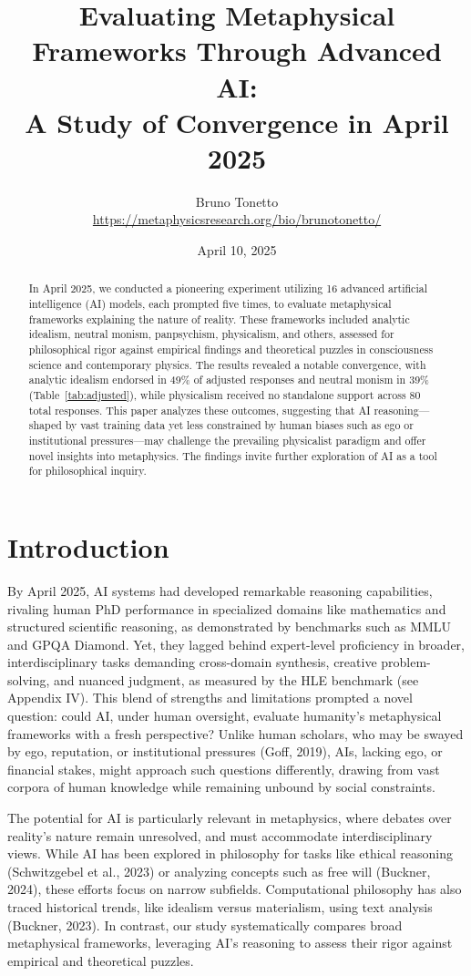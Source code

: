\documentclass[11pt]{article}
\title{Evaluating Metaphysical Frameworks Through Advanced AI: \\ A Study of Convergence in April 2025}
\author{Bruno Tonetto\\
\url{https://metaphysicsresearch.org/bio/brunotonetto/}}
\date{April 10, 2025}
\begin{document}
\maketitle

\begin{abstract}
In April 2025, we conducted a pioneering experiment utilizing 16 advanced artificial intelligence (AI) models, each prompted five times, to evaluate metaphysical frameworks explaining the nature of reality. These frameworks included analytic idealism, neutral monism, panpsychism, physicalism, and others, assessed for philosophical rigor against empirical findings and theoretical puzzles in consciousness science and contemporary physics. The results revealed a notable convergence, with analytic idealism endorsed in 49\% of adjusted responses and neutral monism in 39\% (Table~\ref{tab:adjusted}), while physicalism received no standalone support across 80 total responses. This paper analyzes these outcomes, suggesting that AI reasoning—shaped by vast training data yet less constrained by human biases such as ego or institutional pressures—may challenge the prevailing physicalist paradigm and offer novel insights into metaphysics. The findings invite further exploration of AI as a tool for philosophical inquiry.
\end{abstract}

\section{Introduction}
By April 2025, AI systems had developed remarkable reasoning capabilities, rivaling human PhD performance in specialized domains like mathematics and structured scientific reasoning, as demonstrated by benchmarks such as MMLU and GPQA Diamond. Yet, they lagged behind expert-level proficiency in broader, interdisciplinary tasks demanding cross-domain synthesis, creative problem-solving, and nuanced judgment, as measured by the HLE benchmark (see Appendix IV). This blend of strengths and limitations prompted a novel question: could AI, under human oversight, evaluate humanity’s metaphysical frameworks with a fresh perspective? Unlike human scholars, who may be swayed by ego, reputation, or institutional pressures (Goff, 2019), AIs, lacking ego, or financial stakes, might approach such questions differently, drawing from vast corpora of human knowledge while remaining unbound by social constraints.

The potential for AI is particularly relevant in metaphysics, where debates over reality’s nature remain unresolved, and must accommodate interdisciplinary views. While AI has been explored in philosophy for tasks like ethical reasoning (Schwitzgebel et al., 2023) or analyzing concepts such as free will (Buckner, 2024), these efforts focus on narrow subfields. Computational philosophy has also traced historical trends, like idealism versus materialism, using text analysis (Buckner, 2023). In contrast, our study systematically compares broad metaphysical frameworks, leveraging AI's reasoning to assess their rigor against empirical and theoretical puzzles.
\end{document}
